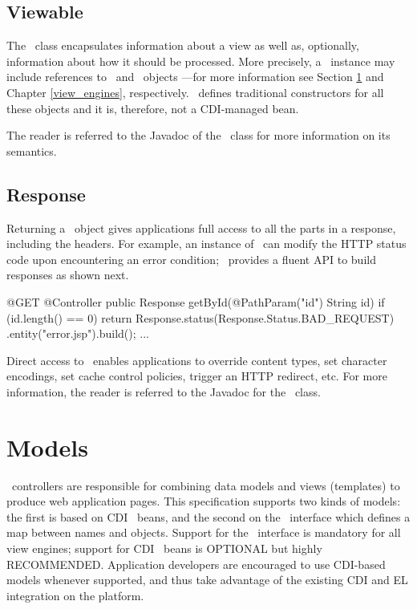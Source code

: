 \subsection{Viewable}
\label{viewable}

The \Viewable\ class encapsulates information about a view as well as, optionally, 
information about how it  should be processed. More precisely, a \Viewable\ instance 
may include references to \Models\ and \ViewEngine\ objects ---for more information 
see Section \ref{models} and Chapter \ref{view_engines}, respectively. 
\Viewable\ defines traditional constructors for all these objects and it is, therefore, 
not a CDI-managed bean.

The reader is referred to the Javadoc of the \Viewable\ class for more information on its semantics.

\subsection{Response}
\label{response}

Returning a \Response\ object gives applications full access to all the parts in a response, 
including the headers. For example, an instance of  \Response\ can modify the HTTP status
code upon encountering an error condition; \jaxrs\ provides a fluent API to build responses
as shown next.

\begin{listing}{1}
@GET
@Controller
public Response getById(@PathParam("id") String id) {
    if (id.length() == 0) {
   	    return Response.status(Response.Status.BAD_REQUEST)
   	                   .entity("error.jsp").build();
    } 
    ...
}
\end{listing}

Direct access to \Response\ enables applications to override content types, set character
encodings, set cache control policies, trigger an HTTP redirect, etc. For more information, 
the reader is referred to the Javadoc for the \Response\ class.

\section{Models}
\label{models}

\mvc\ controllers are responsible for combining data models and views (templates) to 
produce web application pages. This specification supports two kinds of models: the
first is based on CDI \Named\ beans, and the second on the \Models\ interface
which defines a map between names and objects. Support for the \Models\ 
interface is mandatory for all view engines; support for CDI \Named\ beans is
OPTIONAL but highly RECOMMENDED. Application developers are encouraged to use CDI-based
models whenever supported, and thus take advantage of the existing CDI and EL integration
on the platform. 

